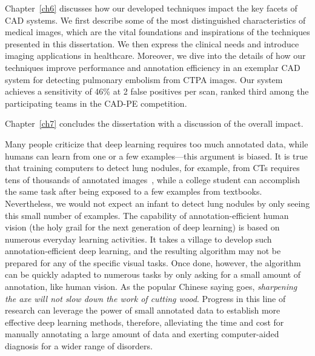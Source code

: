 Chapter~\ref{ch6} discusses how our developed techniques impact the key facets of CAD systems. We first describe some of the most distinguished characteristics of medical images, which are the vital foundations and inspirations of the techniques presented in this dissertation. We then express the clinical needs and introduce imaging applications in healthcare. Moreover, we dive into the details of how our techniques improve performance and annotation efficiency in an exemplar CAD system for detecting pulmonary embolism from CTPA images. Our system achieves a sensitivity of 46\% at 2 false positives per scan, ranked third among the participating teams in the CAD-PE competition.
    
Chapter~\ref{ch7} concludes the dissertation with a discussion of the overall impact. 


Many people criticize that deep learning requires too much annotated data, while humans can learn from one or a few examples---this argument is biased. It is true that training computers to detect lung nodules, for example, from CTs requires tens of thousands of annotated images~\citep{ardila2019end}, while a college student can accomplish the same task after being exposed to a few examples from textbooks. Nevertheless, we would not expect an infant to detect lung nodules by only seeing this small number of examples. The capability of annotation-efficient human vision (the holy grail for the next generation of deep learning) is based on numerous everyday learning activities. It takes a village to develop such annotation-efficient deep learning, and the resulting algorithm may not be prepared for any of the specific visual tasks. Once done, however, the algorithm can be quickly adapted to numerous tasks by only asking for a small amount of annotation, like human vision. As the popular Chinese saying goes, \textit{sharpening the axe will not slow down the work of cutting wood}. Progress in this line of research can leverage the power of small annotated data to establish more effective deep learning methods, therefore, alleviating the time and cost for manually annotating a large amount of data and exerting computer-aided diagnosis for a wider range of disorders.


